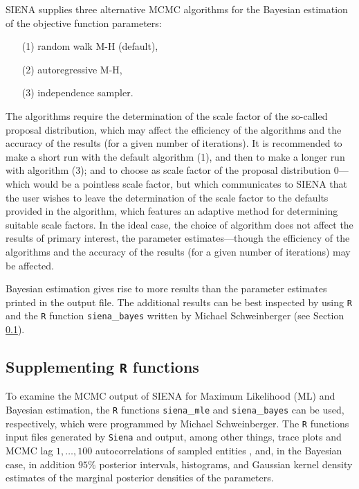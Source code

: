 \documentclass[a4paper,fleqn,11pt]{article}
\newcommand{\+}{\, + \,}
\newcommand{\SI}{{\sf SIENA }}
\begin{document}
\iffalse
\SI supplies three alternative MCMC algorithms for the
Bayesian estimation of the objective function parameters:
\begin{itemize}
\item[(1)] random walk M-H (default),
\item[(2)] autoregressive M-H,
\item[(3)] independence sampler.
\end{itemize}
The algorithms require the determination of the scale factor of
the so-called proposal distribution, which may affect the efficiency
of the algorithms and the accuracy of the results (for a given number of iterations).
It is recommended to make a short run with the default algorithm (1),
and then to make a longer run with algorithm (3);
and to choose as scale factor of the proposal
distribution $0$---which would be a pointless scale factor,
but which communicates to \SI that the user wishes to
leave the determination of the scale factor to the defaults provided in the algorithm,
which features an adaptive method for determining suitable
scale factors.
In the ideal case, the choice of algorithm does not affect the
results of primary interest, the parameter estimates---though the
efficiency of the algorithms and the accuracy of the results (for a
given number of iterations) may be affected.

Bayesian estimation gives rise to more results than the parameter
estimates printed in the output file.
The additional results can be best inspected by using {\tt R} and the
{\tt R} function {\tt siena}\_{\tt bayes} written by Michael
Schweinberger (see Section \ref{R_functions}).

\subsection{Supplementing {\tt R} functions}
\label{R_functions}

To examine the MCMC output of \SI for Maximum Likelihood (ML) and Bayesian estimation,
the {\tt R} functions {\tt siena}\_{\tt mle} and {\tt siena}\_{\tt bayes} can be used,
respectively,
which were programmed by Michael Schweinberger.
The {\tt R} functions input files generated by {\tt Siena} and output,
among other things,
trace plots and MCMC lag $1, \dots, 100$ autocorrelations of sampled entities
\citep[see][]{SchweinbergerSnijders07b, SchweinbergerSnijders07c},
and,
in the Bayesian case,
in addition $95\%$ posterior intervals, histograms, and Gaussian kernel density
estimates of the marginal posterior densities of the parameters.
\end{document}
